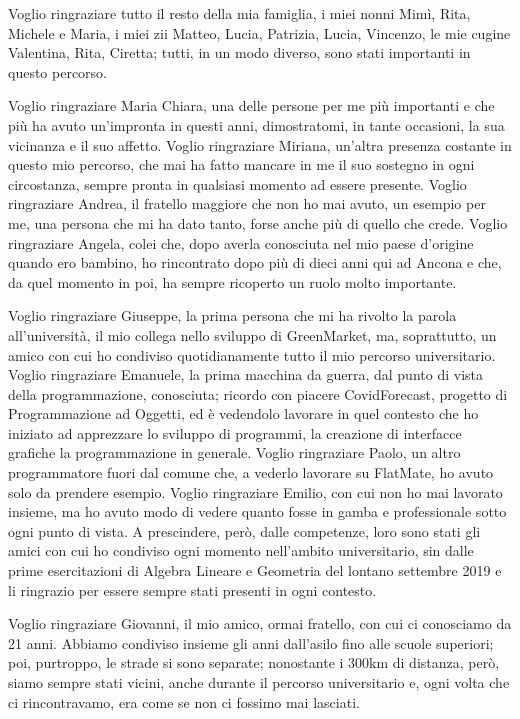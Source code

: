{Voglio ringraziare tutto il resto della mia famiglia, i miei nonni Mimì, Rita, Michele e Maria, i miei zii Matteo, Lucia, Patrizia, Lucia, Vincenzo, le mie cugine Valentina, Rita, Ciretta; tutti, in un modo diverso, sono stati importanti in questo percorso.

Voglio ringraziare Maria Chiara, una delle persone per me più importanti e che più ha avuto un'impronta in questi anni, dimostratomi, in tante occasioni, la sua vicinanza e il suo affetto. Voglio ringraziare Miriana, un’altra presenza costante in questo mio percorso, che mai ha fatto mancare in me il suo sostegno in ogni circostanza, sempre pronta in qualsiasi momento ad essere presente. Voglio ringraziare Andrea, il fratello maggiore che non ho mai avuto, un esempio per me, una persona che mi ha dato tanto, forse anche più di quello che crede. Voglio ringraziare Angela, colei che, dopo averla conosciuta nel mio paese d’origine quando ero bambino, ho rincontrato dopo più di dieci anni qui ad Ancona e che, da quel momento in poi, ha sempre ricoperto un ruolo molto importante.

Voglio ringraziare Giuseppe, la prima persona che mi ha rivolto la parola all’università, il mio collega nello sviluppo di GreenMarket, ma, soprattutto, un amico con cui ho condiviso quotidianamente tutto il mio percorso universitario. Voglio ringraziare Emanuele, la prima macchina da guerra, dal punto di vista della programmazione, conosciuta; ricordo con piacere CovidForecast, progetto di Programmazione ad Oggetti, ed è vedendolo lavorare in quel contesto che ho iniziato ad apprezzare lo sviluppo di programmi, la creazione di interfacce grafiche la programmazione in generale. Voglio ringraziare Paolo, un altro programmatore fuori dal comune che, a vederlo lavorare su FlatMate, ho avuto solo da prendere esempio. Voglio ringraziare Emilio, con cui non ho mai lavorato insieme, ma ho avuto modo di vedere quanto fosse in gamba e professionale sotto ogni punto di vista. A prescindere, però, dalle competenze, loro sono stati gli amici con cui ho condiviso ogni momento nell’ambito universitario, sin dalle prime esercitazioni di Algebra Lineare e Geometria del lontano settembre 2019 e li ringrazio per essere sempre stati presenti in ogni contesto.

Voglio ringraziare Giovanni, il mio amico, ormai fratello, con cui ci conosciamo da 21 anni. Abbiamo condiviso insieme gli anni dall’asilo fino alle scuole superiori; poi, purtroppo, le strade si sono separate; nonostante i 300km di distanza, però, siamo sempre stati vicini, anche durante il percorso universitario e, ogni volta che ci rincontravamo, era come se non ci fossimo mai lasciati.

}
